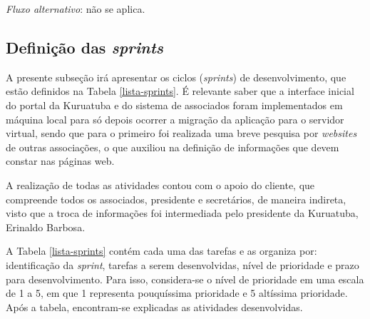 \noindent \textit{Fluxo alternativo}: não se aplica.



\hspace{2.5cm}
\subsection{Definição das \textit{sprints}}
\label{subsec:sprints}
\hspace{2.5cm}

A presente subseção irá apresentar os ciclos (\textit{sprints}) de desenvolvimento, que estão definidos na Tabela \ref{lista-sprints}. É relevante saber que a interface inicial do portal da Kuruatuba e do sistema de associados foram implementados em máquina local para só depois ocorrer a migração da aplicação para o servidor virtual, sendo que para o primeiro foi realizada uma breve pesquisa por \textit{websites} de outras associações, o que auxiliou na definição de informações que devem constar nas páginas web. 

A realização de todas as atividades contou com o apoio do cliente, que compreende todos os associados, presidente e secretários, de maneira indireta, visto que a troca de informações foi intermediada pelo presidente da Kuruatuba, Erinaldo Barbosa.

A Tabela \ref{lista-sprints} contém cada uma das tarefas e as organiza por: identificação da \textit{sprint}, tarefas a serem desenvolvidas, nível de prioridade e prazo para desenvolvimento. Para isso, considera-se o nível de prioridade em uma escala de 1 a 5, em que 1 representa pouquíssima prioridade e 5 altíssima prioridade. Após a tabela, encontram-se explicadas as atividades desenvolvidas.

